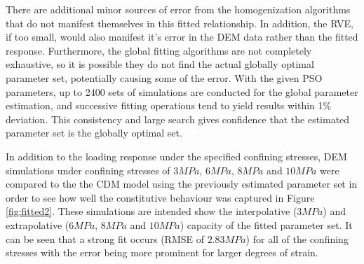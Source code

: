 There are additional minor sources of error from the homogenization algorithms that do not manifest themselves in this fitted relationship.  In addition, the RVE, if too small, would also manifest it's error in the DEM data rather than the fitted response. Furthermore, the global fitting algorithms are not completely exhaustive, so it is possible they do not find the actual globally optimal parameter set, potentially causing some of the error. With the given PSO parameters, up to 2400 sets of simulations are conducted for the global parameter estimation, and successive fitting operations tend to yield results within 1\% deviation. This consistency and large search gives confidence that the estimated parameter set is the globally optimal set. 

In addition to the loading response under the specified confining stresses, DEM simulations under confining stresses of $3MPa$, $6MPa$, $8MPa$ and $10MPa$ were compared to the the CDM model using the previously estimated parameter set in order to see how well the constitutive behaviour was captured in Figure \ref{fig:fitted2}. These simulations are intended show the interpolative ($3MPa$) and extrapolative ($6MPa$, $8MPa$ and $10MPa$) capacity of the fitted parameter set. It can be seen that a strong fit occurs (RMSE of $2.83MPa$) for all of the confining stresses with the error being more prominent for larger degrees of strain.